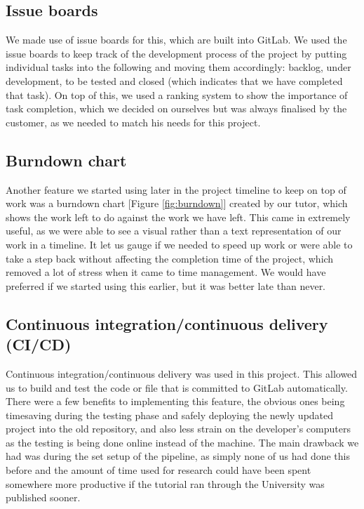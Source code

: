 \documentclass{l3proj}
\begin{document}
\subsection{Issue boards}
We made use of issue boards for this, which are built into GitLab. We used the issue boards to keep track of the development process of the project by putting individual tasks into the following and moving them accordingly: backlog, under development, to be tested and closed (which indicates that we have completed that task). On top of this, we used a ranking system to show the importance of task completion, which we decided on ourselves but was always finalised by the customer, as we needed to match his needs for this project.

\subsection{Burndown chart}
Another feature we started using later in the project timeline to keep on top of work was a burndown chart [Figure \ref{fig:burndown}] created by our tutor, which shows the work left to do against the work we have left. This came in extremely useful, as we were able to see a visual rather than a text representation of our work in a timeline. It let us gauge if we needed to speed up work or were able to take a step back without affecting the completion time of the project, which removed a lot of stress when it came to time management. We would have preferred if we started using this earlier, but it was better late than never.



\subsection{Continuous integration/continuous delivery (CI/CD)}
Continuous integration/continuous delivery was used in this project. This allowed us to build and test the code or file that is committed to GitLab automatically. There were a few benefits to implementing this feature, the obvious ones being timesaving during the testing phase and safely deploying the newly updated project into the old repository, and also less strain on the developer’s computers as the testing is being done online instead of the machine. The main drawback we had was during the set setup of the pipeline, as simply none of us had done this before and the amount of time used for research could have been spent somewhere more productive if the tutorial ran through the University was published sooner.
\end{document}
